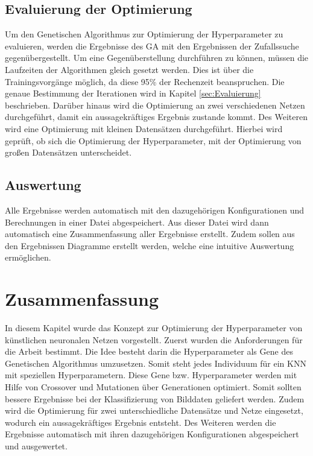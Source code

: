\subsection{Evaluierung der Optimierung}
Um den Genetischen Algorithmus zur Optimierung der Hyperparameter zu evaluieren, werden die Ergebnisse des GA mit den Ergebnissen der Zufallssuche gegenübergestellt. Um eine Gegenüberstellung durchführen zu können, müssen die Laufzeiten der Algorithmen gleich gesetzt werden. Dies ist über die Trainingsvorgänge möglich, da diese 95\% der Rechenzeit beanspruchen. Die genaue Bestimmung der Iterationen wird in Kapitel \ref{sec:Evaluierung} beschrieben. Darüber hinaus wird die Optimierung an zwei verschiedenen Netzen durchgeführt, damit ein aussagekräftiges Ergebnis zustande kommt. Des Weiteren wird eine Optimierung mit kleinen Datensätzen durchgeführt. Hierbei wird geprüft, ob sich die Optimierung der Hyperparameter, mit der Optimierung von großen Datensätzen unterscheidet. 

\subsection{Auswertung}
Alle Ergebnisse werden automatisch mit den dazugehörigen Konfigurationen und Berechnungen in einer Datei abgespeichert. Aus dieser Datei wird dann automatisch eine Zusammenfassung aller Ergebnisse erstellt. Zudem sollen aus den Ergebnissen Diagramme erstellt werden, welche eine intuitive Auswertung ermöglichen.

\newpage

\section{Zusammenfassung}
In diesem Kapitel wurde das Konzept zur Optimierung der Hyperparameter von künstlichen neuronalen Netzen vorgestellt. Zuerst wurden die Anforderungen für die Arbeit bestimmt. Die Idee besteht darin die Hyperparameter als Gene des Genetischen Algorithmus umzusetzen. Somit steht jedes Individuum für ein KNN mit speziellen Hyperparametern. Diese Gene bzw. Hyperparameter werden mit Hilfe von Crossover und Mutationen über Generationen optimiert. Somit sollten bessere Ergebnisse bei der Klassifizierung von Bilddaten geliefert werden. Zudem wird die Optimierung für zwei unterschiedliche Datensätze und Netze eingesetzt, wodurch ein aussagekräftiges Ergebnis entsteht. Des Weiteren werden die Ergebnisse automatisch mit ihren dazugehörigen Konfigurationen abgespeichert und ausgewertet. 